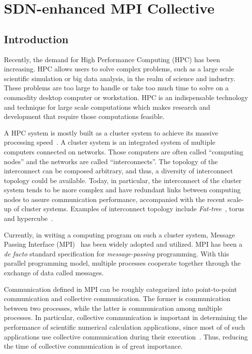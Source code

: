 \chapter{SDN-enhanced MPI Collective}

\hypertarget{introduction}{%
\section{Introduction}\label{introduction}}

Recently, the demand for High Performance Computing (HPC) has been
increasing. HPC allows users to solve complex problems, such as a large
scale scientific simulation or big data analysis, in the realm of
science and industry. These problems are too large to handle or take too
much time to solve on a commodity desktop computer or workstation. HPC
is an indispensable technology and technique for large scale
computations which makes research and development that require those
computations feasible.

A HPC system is mostly built as a cluster system to achieve its massive
processing speed~\cite{top500}. A cluster system is an integrated system
of multiple computers connected on networks. Those computers are often
called ``computing nodes'' and the networks are called
``interconnects''. The topology of the interconnect can be composed
arbitrary, and thus, a diversity of interconnect topology could be
available. Today, in particular, the interconnect of the cluster system
tends to be more complex and have redundant links between computing
nodes to assure communication performance, accompanied with the recent
scale-up of cluster systems. Examples of interconnect topology include
\emph{Fat-tree}~\cite{Leiserson1985}, torus~\cite{Adiga2005} and
hypercube~\cite{Dally2003}.

Currently, in writing a computing program on such a cluster system,
Message Passing Interface
(MPI)~\cite{Gropp1999,MessagePassingInterfaceForum2012} has been widely
adopted and utilized. MPI has been a \emph{de facto} standard specification
for \emph{message-passing} programming. With this parallel programming model,
multiple processes cooperate together through the exchange of data called
messages.

Communication defined in MPI can be roughly categorized into
point-to-point communication and collective communication. The former is
communication between two processes, while the latter is communication
among multiple processes. In particular, collective communication is
important in determining the performance of scientific numerical
calculation applications, since most of of such applications use
collective communication during their execution~\cite{Rabenseifner2000}.
Thus, reducing the time of collective communication is of great
importance.

